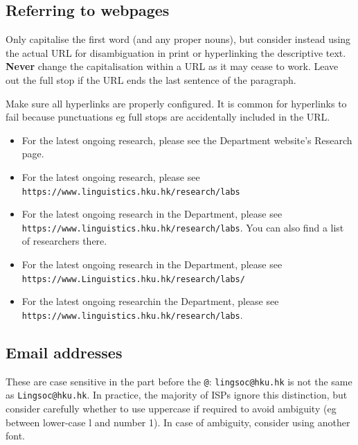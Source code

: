 \documentclass[11pt,a4paper]{book}
\newcommand{\xmark}{{\color{cadmiumred}\ding{54}}}%
\newcommand{\cmark}{{\color{green(html/cssgreen)}\checkmark}}%
\begin{document}
					\subsection{Referring to webpages}
					Only capitalise the first word (and any proper nouns), but consider instead using the actual URL for disambiguation in print or hyperlinking the descriptive text. \textbf{Never} change the capitalisation within a URL as it may cease to work. Leave out the full stop if the URL ends the last sentence of the paragraph.\par\newpage
					Make sure all hyperlinks are properly configured. It is common for hyperlinks to fail because punctuations eg full stops are accidentally included in the URL.
					{\firasans \begin{mdframed}[backgroundcolor=aliceblue] \begin{itemize}[label=\cmark]
						\item For the latest ongoing research, please see the Department website's Research page.
						\item For the latest ongoing research, please see 
						\\ \texttt{https://www.linguistics.hku.hk/research/labs}
						\item For the latest ongoing research in the Department, please see  \texttt{https://www.linguistics.hku.hk/research/labs}. You can also find a list of researchers there.
						\item[\xmark] For the latest ongoing research in the Department, please see  \texttt{https://www.Linguistics.hku.hk/research/labs/}
						\item[\xmark] For the latest ongoing researchin the Department, please see  \texttt{https://www.linguistics.hku.hk/research/labs}.
					\end{itemize} \end{mdframed} }
					\subsection{Email addresses}
					These are case sensitive in the part before the \texttt{@}: \texttt{lingsoc@hku.hk} is not the same as \texttt{Lingsoc@hku.hk}. In practice, the majority of ISPs ignore this distinction, but consider carefully whether to use uppercase if required to avoid ambiguity (eg between lower-case l and number 1). In case of ambiguity, consider using another font.
\end{document}
